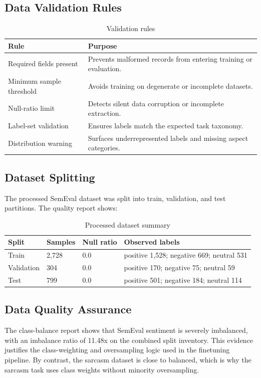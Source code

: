 \documentclass[12pt, a4paper]{article}
\begin{document}
\subsection{Data Validation Rules}
\begin{table}[H]
\centering
\caption{Validation rules}
\begin{tabularx}{\textwidth}{@{} p{3.2cm} X @{}}
\toprule
\textbf{Rule} & \textbf{Purpose} \\
\midrule
Required fields present & Prevents malformed records from entering training or evaluation. \\
Minimum sample threshold & Avoids training on degenerate or incomplete datasets. \\
Null-ratio limit & Detects silent data corruption or incomplete extraction. \\
Label-set validation & Ensures labels match the expected task taxonomy. \\
Distribution warning & Surfaces underrepresented labels and missing aspect categories. \\
\bottomrule
\end{tabularx}
\end{table}

\subsection{Dataset Splitting}
The processed SemEval dataset was split into train, validation, and test partitions. The quality report shows:
\begin{table}[H]
\centering
\caption{Processed dataset summary}
\begin{tabularx}{\textwidth}{@{} p{3cm} p{2cm} p{2.2cm} X @{}}
\toprule
\textbf{Split} & \textbf{Samples} & \textbf{Null ratio} & \textbf{Observed labels} \\
\midrule
Train & 2,728 & 0.0 & positive 1,528; negative 669; neutral 531 \\
Validation & 304 & 0.0 & positive 170; negative 75; neutral 59 \\
Test & 799 & 0.0 & positive 501; negative 184; neutral 114 \\
\bottomrule
\end{tabularx}
\end{table}

\subsection{Data Quality Assurance}
The class-balance report shows that SemEval sentiment is severely imbalanced, with an imbalance ratio of 11.48x on the combined split inventory. This evidence justifies the class-weighting and oversampling logic used in the finetuning pipeline. By contrast, the sarcasm dataset is close to balanced, which is why the sarcasm task uses class weights without minority oversampling.
\end{document}
